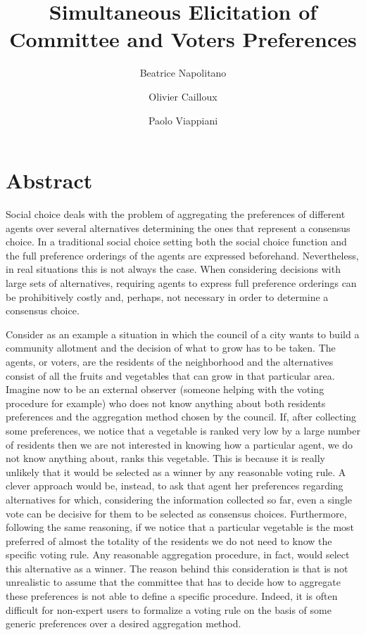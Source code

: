 \documentclass[a4paper]{article}
\author[1]{Beatrice Napolitano}
\author[1]{Olivier Cailloux}
\author[2]{Paolo Viappiani}
\affil[1]{LAMSADE, UMR 7243, CNRS and Universit\'e Paris Dauphine, PSL Research University, Paris, France}
\affil[2]{LIP6, UMR 7606, CNRS and Sorbonne Universit\'e, Paris, France}
\affil[ ]{ }
\affil[ ]{\{firstname.lastname\}@dauphine.fr, paolo.viappiani@lip6.fr}
\begin{document}
\date{}
\title{\Large\bf Simultaneous Elicitation of Committee and Voters Preferences}

\maketitle

\section*{Abstract}
Social choice deals with the problem of aggregating the preferences of different agents over several alternatives determining the ones that represent a consensus choice. In a traditional social choice setting both the social choice function and the full preference orderings of the agents are expressed beforehand. Nevertheless, in real situations this is not always the case. When considering decisions with large sets of alternatives, requiring agents to express full preference orderings can be prohibitively costly and, perhaps, not necessary in order to determine a consensus choice.

Consider as an example a situation in which the council of a city wants to build a community allotment and the decision of what to grow has to be taken. The agents, or voters, are the residents of the neighborhood and the alternatives consist of all the fruits and vegetables that can grow in that particular area. Imagine now to be an external observer (someone helping with the voting procedure for example) who does not know anything about both residents preferences and the aggregation method chosen by the council. If, after collecting some preferences, we notice that a vegetable is ranked very low by a large number of residents then we are not interested in knowing how a particular agent, we do not know anything about, ranks this vegetable. This is because it is really unlikely that it would be selected as a winner by any reasonable voting rule. A clever approach would be, instead, to ask that agent her preferences regarding alternatives for which, considering the information collected so far, even a single vote can be decisive for them to be selected as consensus choices. Furthermore, following the same reasoning, if we notice that a particular vegetable is the most preferred of almost the totality of the residents we do not need to know the specific voting rule. Any reasonable aggregation procedure, in fact, would select this alternative as a winner. The reason behind this consideration is that is not unrealistic to assume that the committee that has to decide how to aggregate these preferences is not able to define a specific procedure. Indeed, it is often difficult for non-expert users to formalize a voting rule on the basis of some generic preferences over a desired aggregation method.
\end{document}
